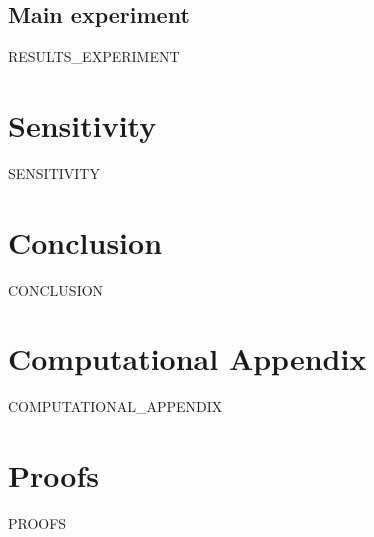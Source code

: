 \subsection{Main experiment}
{{RESULTS_EXPERIMENT}}

\section{Sensitivity}
\label{sec:sensitivity}
{{SENSITIVITY}}

\section{Conclusion}
\label{sec:conclusion}
{{CONCLUSION}}

\appendix
\section{Computational Appendix}
\label{app:computation}
{{COMPUTATIONAL_APPENDIX}}

\section{Proofs}
\label{app:proofs}
{{PROOFS}}


